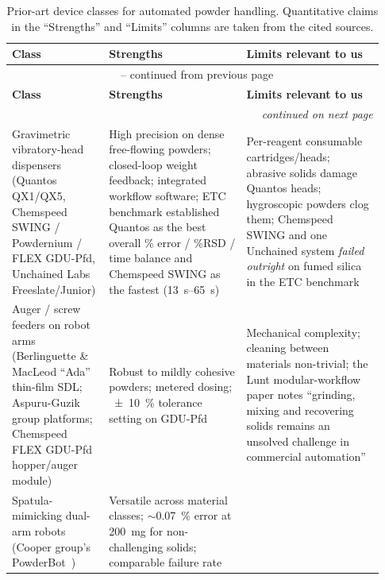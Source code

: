 \documentclass[11pt,a4paper]{article}
\begin{document}
\begin{small}
\begin{longtable}{@{}p{0.21\linewidth}p{0.36\linewidth}p{0.36\linewidth}@{}}
\caption{Prior-art device classes for automated powder handling. Quantitative
claims in the ``Strengths'' and ``Limits'' columns are taken from the cited
sources.}
\label{tab:priorart}\\
\toprule
\textbf{Class} & \textbf{Strengths} & \textbf{Limits relevant to us} \\
\midrule
\endfirsthead
\multicolumn{3}{c}{\tablename\ \thetable{} -- continued from previous page}\\
\toprule
\textbf{Class} & \textbf{Strengths} & \textbf{Limits relevant to us} \\
\midrule
\endhead
\midrule
\multicolumn{3}{r}{\emph{continued on next page}}\\
\endfoot
\bottomrule
\endlastfoot
Gravimetric vibratory-head dispensers (Quantos QX1/QX5, Chemspeed SWING /
Powdernium / FLEX GDU-Pfd, Unchained Labs Freeslate/Junior) &
High precision on dense free-flowing powders; closed-loop weight feedback;
integrated workflow software; ETC benchmark established Quantos as the best
overall \% error / \%RSD / time balance and Chemspeed SWING as the fastest
(\SIrange{13}{65}{\second})~\cite{bahr2018collaborativeevaluationof,bahr2020recentadvancesin} &
Per-reagent consumable cartridges/heads; abrasive solids damage Quantos
heads; hygroscopic powders clog them; Chemspeed SWING and one Unchained
system \emph{failed outright} on fumed silica in the ETC
benchmark~\cite{bahr2018collaborativeevaluationof,carruthers2025amobilerobotic} \\
\addlinespace
Auger / screw feeders on robot arms (Berlinguette \& MacLeod ``Ada''
thin-film SDL; Aspuru-Guzik group platforms; Chemspeed FLEX GDU-Pfd
hopper/auger module) &
Robust to mildly cohesive powders; metered dosing; \SI{\pm10}{\percent}
tolerance setting on GDU-Pfd~\cite{bahr2020recentadvancesin} &
Mechanical complexity; cleaning between materials non-trivial; the Lunt
modular-workflow paper notes ``grinding, mixing and recovering solids
remains an unsolved challenge in commercial
automation''~\cite{lunt2023modularmultirobotintegration,lunt2024aroboticworkflow} \\
\addlinespace
Spatula-mimicking dual-arm robots (Cooper group's
PowderBot~\cite{jiang2023autonomousbiomimeticsolid}) &
Versatile across material classes; \(\sim\)\SI{0.07}{\percent} error at
\SI{200}{\milli\gram} for non-challenging solids; comparable failure rate

\end{longtable}
\end{small}
\end{document}
